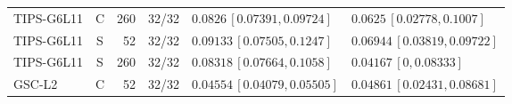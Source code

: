 \begin{longtable}{lcrcp{44mm}p{44mm}}
TIPS-G6L11 & C & 260 & 32/32 & \(0.0826\,[0.07391,0.09724]\) & \(0.0625\,[0.02778,0.1007]\)\\
TIPS-G6L11 & S & 52 & 32/32 & \(0.09133\,[0.07505,0.1247]\) & \(0.06944\,[0.03819,0.09722]\)\\
TIPS-G6L11 & S & 260 & 32/32 & \(0.08318\,[0.07664,0.1058]\) & \(0.04167\,[0,0.08333]\)\\
GSC-L2 & C & 52 & 32/32 & \(0.04554\,[0.04079,0.05505]\) & \(0.04861\,[0.02431,0.08681]\)\\

\end{longtable}
